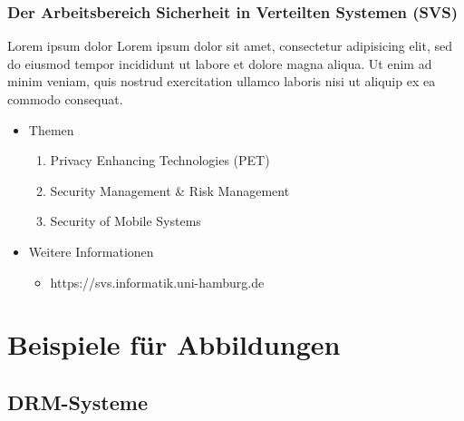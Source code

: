 \documentclass[t,aspectratio=169]{beamer}
\begin{document}
\begin{frame}
	\frametitle{Der Arbeitsbereich Sicherheit in Verteilten Systemen (SVS)}
	\begin{alertblock}{Lorem ipsum dolor}
		Lorem ipsum dolor sit amet, consectetur adipisicing elit, sed do eiusmod tempor incididunt ut labore et dolore magna aliqua. Ut enim ad minim veniam, quis nostrud exercitation ullamco laboris nisi ut aliquip ex ea commodo consequat. 
	\end{alertblock}
	\begin{itemize}
		\item Themen
			\begin{enumerate}
				\item Privacy Enhancing Technologies (PET)
				\item Security Management \& Risk Management
				\item Security of Mobile Systems
			\end{enumerate}
		\item Weitere Informationen
			\begin{itemize}
				\item https://svs.informatik.uni-hamburg.de
			\end{itemize}
	\end{itemize}
\end{frame}

\section{Beispiele für Abbildungen} %

\subsection{DRM-Systeme} %
\end{document}
